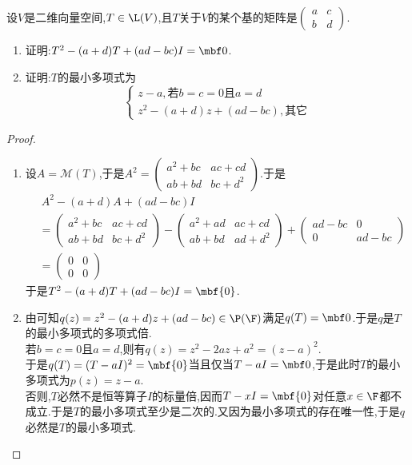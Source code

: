 \documentclass{ctexart}
\begin{document}
\begin{problem}[11.]
    设$V$是二维向量空间,$T\in\L(V)$,且$T$关于$V$的某个基的矩阵是$\begin{pmatrix}a&c\\b&d\end{pmatrix}$.
    \begin{enumerate}[label=\tbf{(\arabic*)}]
        \item 证明:$T^2-(a+d)T+(ad-bc)I=\mbf0$.
        \item 证明:$T$的最小多项式为
            \[\left\{\begin{array}{l}
                z-a,\text{若}b=c=0\text{且}a=d\\
                z^2-(a+d)z+(ad-bc),\text{其它}
            \end{array}\right.\]
    \end{enumerate}
\end{problem}
\begin{proof}
    \begin{enumerate}[label=\tbf{(\arabic*)}]
        \item 设$A=\mathcal{M}(T)$,于是$A^2=\begin{pmatrix}a^2+bc&ac+cd\\ab+bd&bc+d^2\end{pmatrix}$.于是
            \[\begin{aligned}
                &\ A^2-(a+d)A+(ad-bc)I\\
                &= \begin{pmatrix}a^2+bc&ac+cd\\ab+bd&bc+d^2\end{pmatrix}-\begin{pmatrix}a^2+ad&ac+cd\\ab+bd&ad+d^2\end{pmatrix}+\begin{pmatrix}ad-bc&0\\0&ad-bc\end{pmatrix} \\
                &= \begin{pmatrix}0&0\\0&0\end{pmatrix}
            \end{aligned}\]
            于是$T^2-(a+d)T+(ad-bc)I=\mbf{0}$.
        \item 由可知$q(z)=z^2-(a+d)z+(ad-bc)\in\P(\F)$满足$q(T)=\mbf0$.于是$q$是$T$的最小多项式的多项式倍.\\
            若$b=c=0$且$a=d$,则有$q(z)=z^2-2az+a^2=(z-a)^2$.\\
            于是$q(T)=(T-aI)^2=\mbf{0}$当且仅当$T-aI=\mbf0$,于是此时$T$的最小多项式为$p(z)=z-a$.\\
            否则,$T$必然不是恒等算子$I$的标量倍,因而$T-xI=\mbf{0}$对任意$x\in\F$都不成立.于是$T$的最小多项式至少是二次的.又因为最小多项式的存在唯一性,于是$q$必然是$T$的最小多项式.
    \end{enumerate}
\end{proof}
\end{document}
